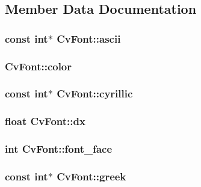 \subsection{Member Data Documentation}
\hypertarget{structCvFont_afc9430164e0b91a85965e034001c4b70}{
\subsubsection[{ascii}]{\setlength{\rightskip}{0pt plus 5cm}const int$\ast$ Cv\-Font\-::ascii}}\label{structCvFont_afc9430164e0b91a85965e034001c4b70}
\hypertarget{structCvFont_a91b24265cbcfefbd12da8974588f47b6}{
\subsubsection[{color}]{ Cv\-Font\-::color}}\label{structCvFont_a91b24265cbcfefbd12da8974588f47b6}
\hypertarget{structCvFont_a7b29fd406e20a69b222fbe66236f681d}{
\subsubsection[{cyrillic}]{\setlength{\rightskip}{0pt plus 5cm}const int$\ast$ Cv\-Font\-::cyrillic}}\label{structCvFont_a7b29fd406e20a69b222fbe66236f681d}
\hypertarget{structCvFont_ab6075f079d1c8be002a320f93c4a1824}{
\subsubsection[{dx}]{\setlength{\rightskip}{0pt plus 5cm}float Cv\-Font\-::dx}}\label{structCvFont_ab6075f079d1c8be002a320f93c4a1824}
\hypertarget{structCvFont_a2de0fc46f5753aa4c116f458892e62d0}{
\subsubsection[{font\-\_\-face}]{\setlength{\rightskip}{0pt plus 5cm}int Cv\-Font\-::font\-\_\-face}}\label{structCvFont_a2de0fc46f5753aa4c116f458892e62d0}
\hypertarget{structCvFont_af55a3757145c476173f919e847bbca30}{
\subsubsection[{greek}]{\setlength{\rightskip}{0pt plus 5cm}const int$\ast$ Cv\-Font\-::greek}}\label{structCvFont_af55a3757145c476173f919e847bbca30}
